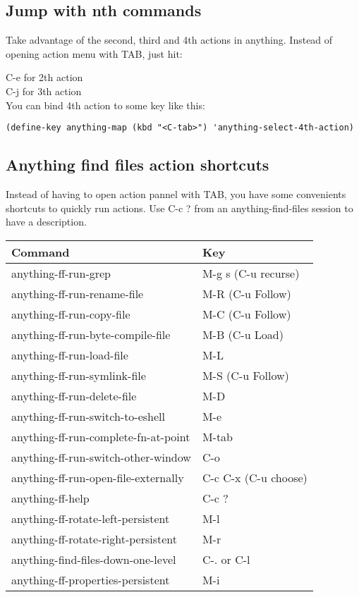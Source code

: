 \documentclass[a4paper,11pt]{article}
\begin{document}
\subsection{Jump with nth commands}
\label{sec:jump-with-nth}
Take advantage of the second, third and 4th actions in anything.
Instead of opening action menu with TAB, just hit:

C-e for 2th action\\
C-j for 3th action\\

You can bind 4th action to some key like this:
\begin{verbatim}
(define-key anything-map (kbd "<C-tab>") 'anything-select-4th-action)
\end{verbatim}
\newpage
\subsection{Anything find files action shortcuts}
\label{sec:anything-find-files-1}
Instead of having to open action pannel with TAB, 
you have some convenients shortcuts to quickly run actions.
Use C-c ? from an anything-find-files session to have a description.\\

\begin{tabular}{| l | l |}
  \hline
  Command & Key \\
  \hline
  anything-ff-run-grep & M-g s (C-u recurse)\\
  \hline
  anything-ff-run-rename-file & M-R (C-u Follow)\\
  \hline
  anything-ff-run-copy-file & M-C (C-u Follow)\\
  \hline
  anything-ff-run-byte-compile-file & M-B (C-u Load)\\
  \hline
  anything-ff-run-load-file & M-L \\
  \hline
  anything-ff-run-symlink-file & M-S (C-u Follow)\\
  \hline
  anything-ff-run-delete-file & M-D \\
  \hline
  anything-ff-run-switch-to-eshell & M-e \\
  \hline
  anything-ff-run-complete-fn-at-point & M-tab \\
  \hline
  anything-ff-run-switch-other-window & C-o \\
  \hline
  anything-ff-run-open-file-externally & C-c C-x (C-u choose)\\
  \hline
  anything-ff-help & C-c ? \\
  \hline
  anything-ff-rotate-left-persistent & M-l \\
  \hline
  anything-ff-rotate-right-persistent & M-r \\
  \hline
  anything-find-files-down-one-level & C-. or C-l \\
  \hline
  anything-ff-properties-persistent & M-i \\
  \hline
\end{tabular}
\end{document}

